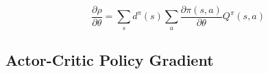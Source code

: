 \documentclass[conference]{IEEEtran}
\begin{document}
\begin{equation}
\frac{\partial \rho}{\partial \theta} = 
\sum_s d^\pi (s) \sum_a \frac{\partial \pi (s,a)}{\partial \theta} 
Q^\pi (s,a)
\end{equation}

\subsection{Actor-Critic Policy Gradient}











%
%
%
\end{document}
